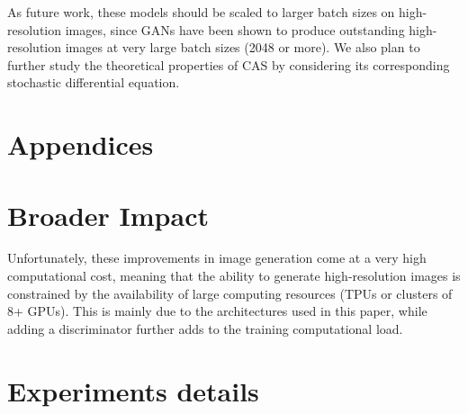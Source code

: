 \documentclass{article} \usepackage{iclr2021_conference_notitle,times}
\theoremstyle{definition}
\theoremstyle{definition}
\begin{document}
As future work, these models should be scaled to larger batch sizes on high-resolution images, since GANs have been shown to produce outstanding high-resolution images at very large batch sizes (2048 or more). We also plan to further study the theoretical properties of CAS by considering its corresponding stochastic differential equation. 

\iffalse

\subsubsection*{Acknowledgments}

We  would like to thank Yang Song, Linda Petrini, Florian Bordes,  Vikram Voleti, Amartya Mitra, Isabela Albuquerque, and Reyhane Askari for their useful discussions and feedback. We thank Yang Song for suggesting to use the diffusion network architecture. Alexia would like to thank her wife Emy Gervais for her support.


We would also
like to thank Compute Canada and Calcul Québec
for the GPUs which were used in this work. This
work was also partially supported by  the NSERC ES-D grant (ESD3-546493-2020), the FRQNT new
researcher program (2019-NC-257943), the NSERC Discovery grant (RGPIN-2019-06512), a startup grant by
IVADO, a grant by Microsoft Research and a Canada
CIFAR AI chair.
\fi




\clearpage

\appendix
\section*{Appendices}

\section{Broader Impact}\label{app:broader_impact}

Unfortunately, these improvements in image generation come at a very high computational cost, meaning that the ability to generate high-resolution images is constrained by the availability of large computing resources (TPUs or clusters of 8+ GPUs). This is mainly due to the architectures used in this paper, while adding a discriminator further adds to the training computational load.

\section{Experiments details}
\label{app:exp_details}
\end{document}
